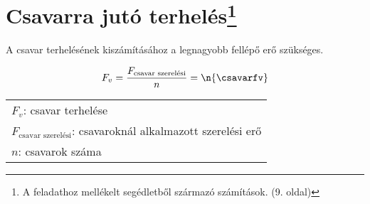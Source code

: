 \section[Csavarra jutó terhelés]{Csavarra jutó terhelés\protect\footnote{A feladathoz mellékelt segédletből származó számítások. (9. oldal)}}

A csavar terhelésének kiszámításához a legnagyobb fellépő erő szükséges.

\begin{equation}
	F_v = \frac{F_\text{csavar szerelési}}{n} = \n{\csavarfv}
\end{equation}

\begin{center}
	\begin{tabular}{l}
		$F_v$: csavar terhelése \siunit{}{\newton} \\
		$F_\text{csavar szerelési}$: csavaroknál alkalmazott szerelési erő \siunit{}{\newton} \\
		$n$: csavarok száma \siunit{}{db} \\
	\end{tabular}
\end{center}

